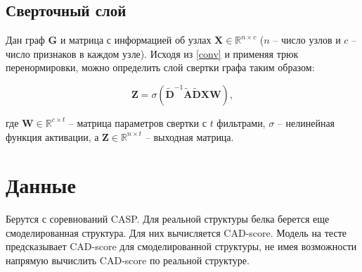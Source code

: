 \documentclass[12pt,twosides]{article}
\begin{document}
	
	\subsection{Сверточный слой}
	
	Дан граф $\mathbf{G}$ и матрица с информацией об узлах $\mathbf{X} \in \mathbb{R}^{n \times c}$ ($n$ -- число узлов и $c$ -- число признаков в каждом узле). Исходя из \ref{conv} и применяя трюк перенормировки, можно определить слой свертки графа таким образом:
	
	$$\mathbf{Z}=\sigma\left(\tilde{\mathbf{D}}^{-1} \tilde{\mathbf{A}}\tilde{\mathbf{D}} \mathbf{X} \mathbf{W}\right),$$
	
	где $\mathbf{W} \in \mathbb{R}^{c \times t}$ – матрица параметров свертки с $t$ фильтрами, $\sigma$ – нелинейная функция активации, а $\mathbf{Z} \in \mathbb{R}^{n \times t}$ -- выходная матрица.
	
		
	
	\section{Данные}
	Берутся с соревнований CASP. Для реальной структуры белка берется еще смоделированная структура. Для них вычисляется CAD-score. Модель на тесте предсказывает CAD-score для смоделированной структуры, не имея возможности напрямую вычислить CAD-score по реальной структуре.
	
\end{document}
